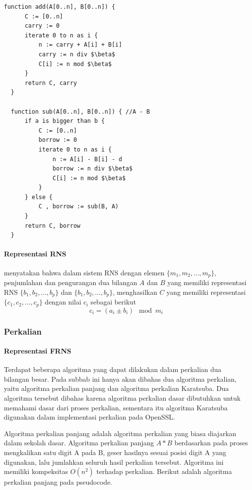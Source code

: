 \begin{lstlisting}[basicstyle=\linespread{1.25}\footnotesize\rmfamily]
  function add(A[0..n], B[0..n]) {
      C := [0..n]
      carry := 0
      iterate 0 to n as i {
          n := carry + A[i] + B[i]
          carry := n div $\beta$
          C[i] := n mod $\beta$
      }
      return C, carry
  }

  function sub(A[0..n], B[0..n]) { //A - B
      if a is bigger than b {
          C := [0..n]
          borrow := 0
          iterate 0 to n as i {
              n := A[i] - B[i] - d
              borrow := n div $\beta$
              C[i] := n mod $\beta$
          }
      } else {
          C , borrow := sub(B, A)
      }
      return C, borrow
  }
\end{lstlisting}



\paragraph{Representasi RNS}

\citet{rns_sharoun} menyatakan bahwa dalam sistem RNS dengan elemen $\{m_1,m_2,...,m_p\}$, penjumlahan dan pengurangan dua bilangan $A$ dan $B$ yang memiliki representasi RNS $\{b_1,b_2,...,b_p\}$ dan $\{b_1,b_2,...,b_p\}$,  menghasilkan $C$ yang memiliki representasi $\{c_1,c_2,...,c_p\}$ dengan nilai $c_i$ sebagai berikut
\begin{equation}
    c_i = (a_i \pm b_i) \mod m_i
\end{equation}


\subsubsection{Perkalian}

\paragraph{Representasi FRNS}
Terdapat beberapa algoritma yang dapat dilakukan dalam perkalian dua bilangan besar. Pada subbab ini hanya akan dibahas dua algoritma perkalian, yaitu algoritma perkalian panjang dan algoritma perkalian Karatsuba. Dua algoritma tersebut dibahas karena algoritma perkalian dasar dibutuhkan untuk memahami dasar dari proses perkalian, sementara itu algoritma Karatsuba digunakan dalam implementasi perkalian pada OpenSSL.

Algoritma perkalian panjang adalah algoritma perkalian yang biasa diajarkan dalam sekolah dasar. Algoritma perkalian panjang $A*B$ berdasarkan pada proses mengkalikan satu digit A pada B, geser hasilnya sesuai posisi digit A yang digunakan, lalu jumlahkan seluruh hasil perkalian tersebut. Algoritma ini memiliki kompeksitas $O(n^2)$ terhadap perkalian. Berikut adalah algoritma perkalian panjang pada pseudocode.

